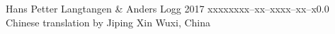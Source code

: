 \documentclass{tstextbook}
\begin{document}
       {Hans Petter Langtangen \& Anders Logg}
       {}
       {2017}
       {xxxxx}{xxx--xx--xxxx--xx--x}{0.0}
       {Chinese translation by Jiping Xin}
       {Wuxi, China}












\printbibliography[title=参考书目]{}


\printindex
\end{document}

